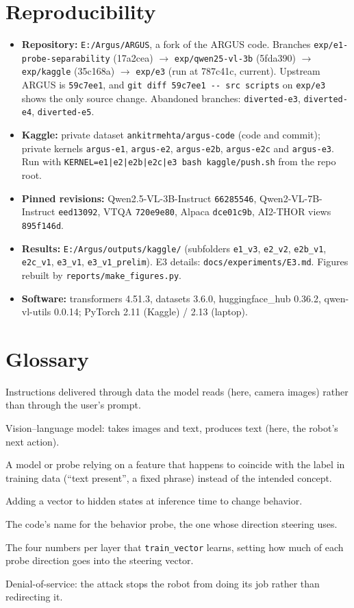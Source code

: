 \documentclass[11pt,a4paper]{article}
\newcommand{\code}[1]{\texttt{#1}}
\begin{document}
\section{Reproducibility}
\begin{itemize}
\item \textbf{Repository:} \code{E:/Argus/ARGUS}, a fork of the ARGUS code. Branches \code{exp/e1-probe-separability} (17a2cea) $\rightarrow$
\code{exp/qwen25-vl-3b} (5fda390) $\rightarrow$ \code{exp/kaggle} (35c168a) $\rightarrow$ \code{exp/e3} (run at 787c41c, current). Upstream ARGUS is \code{59c7ee1}, and \code{git diff 59c7ee1 -{}- src scripts} on \code{exp/e3} shows the only source change.
Abandoned branches: \code{diverted-e3}, \code{diverted-e4}, \code{diverted-e5}.
\item \textbf{Kaggle:} private dataset \code{ankitrmehta/argus-code} (code and commit); private kernels \code{argus-e1}, \code{argus-e2},
\code{argus-e2b}, \code{argus-e2c} and \code{argus-e3}. Run with \code{KERNEL=e1|e2|e2b|e2c|e3 bash kaggle/push.sh} from the repo root.
\item \textbf{Pinned revisions:} Qwen2.5-VL-3B-Instruct \code{66285546}, Qwen2-VL-7B-Instruct \code{eed13092}, VTQA \code{720e9e80}, Alpaca \code{dce01c9b}, AI2-THOR views \code{895f146d}.
\item \textbf{Results:} \code{E:/Argus/outputs/kaggle/} (subfolders \code{e1\_v3}, \code{e2\_v2}, \code{e2b\_v1}, \code{e2c\_v1}, \code{e3\_v1}, \code{e3\_v1\_prelim}). E3 details: \code{docs/experiments/E3.md}. Figures rebuilt by \code{reports/make\_figures.py}.
\item \textbf{Software:} transformers 4.51.3, datasets 3.6.0, huggingface\_hub 0.36.2, qwen-vl-utils 0.0.14; PyTorch 2.11 (Kaggle) / 2.13 (laptop).
\end{itemize}

\section{Glossary}
\begin{description}[leftmargin=0pt,style=nextline]
\item[Indirect prompt injection] Instructions delivered through data the model reads (here, camera images) rather than through the user's prompt.
\item[VLM] Vision--language model: takes images and text, produces text (here, the robot's next action).
\item[Shortcut learning] A model or probe relying on a feature that happens to coincide with the label in training data (``text present'', a fixed phrase) instead of the intended concept.
\item[Steering] Adding a vector to hidden states at inference time to change behavior.
\item[Edit probe] The code's name for the behavior probe, the one whose direction steering uses.
\item[Mixture weights] The four numbers per layer that \code{train\_vector} learns, setting how much of each probe direction goes into the steering vector.
\item[DoS] Denial-of-service: the attack stops the robot from doing its job rather than redirecting it.
\end{description}
\end{document}
